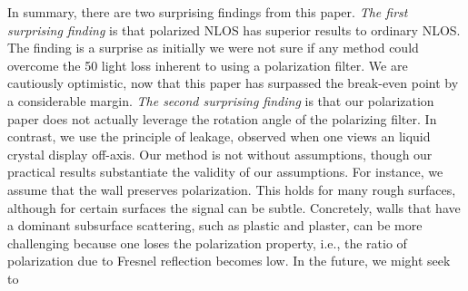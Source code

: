\documentclass[10pt,twocolumn,letterpaper]{article}
\begin{document}
In summary, there are two surprising findings from this
paper. \textit{The first surprising finding} is that polarized NLOS
has superior results to ordinary NLOS. The finding is a surprise
as initially we were not sure if any method could overcome
the 50 light loss inherent to using a polarization filter.
We are cautiously optimistic, now that this paper has
surpassed the break-even point by a considerable margin.
\textit{The second surprising finding} is that our polarization paper
does not actually leverage the rotation angle of the polarizing
filter. In contrast, we use the principle of leakage,
observed when one views an liquid crystal display off-axis.
Our method is not without assumptions, though our practical
results substantiate the validity of our assumptions. For
instance, we assume that the wall preserves polarization.
This holds for many rough surfaces, although for certain
surfaces the signal can be subtle. Concretely, walls that
have a dominant subsurface scattering, such as plastic and
plaster, can be more challenging because one loses the polarization
property, i.e., the ratio of polarization due to Fresnel
reflection becomes low. In the future, we might seek to

{\small


}
\end{document}
